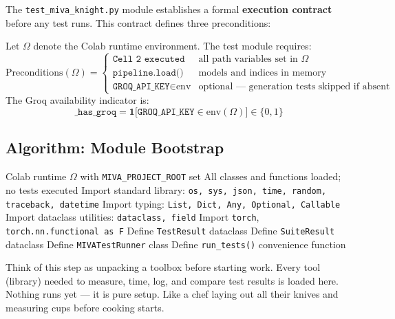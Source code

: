 \documentclass[12pt,a4paper]{article}
\newenvironment{plainbox}[1][Plain Language]{%
  \begin{tcolorbox}[
    enhanced, breakable,
    colback=lightpurplebox!40, colframe=purple!50,
    fonttitle=\bfseries\color{purple!70!black},
    title={#1},
    attach boxed title to top left={yshift=-2mm,xshift=5mm},
    boxed title style={colback=purple!40,colframe=purple!50}
  ]%
}{\end{tcolorbox}}
\newcounter{mdef}[section]
\newenvironment{mdef}[1][]{%
  \refstepcounter{mdef}%
  \begin{tcolorbox}[mydef, title={Definition~\thesection.\themdef%
    \ifx\relax#1\relax\else\ (#1)\fi}]%
}{\end{tcolorbox}}
\begin{document}
The \texttt{test\_miva\_knight.py} module establishes a formal \textbf{execution contract}
before any test runs. This contract defines three preconditions:

\begin{mdef}[Execution Preconditions]
Let $\Omega$ denote the Colab runtime environment. The test module requires:
\[
  \text{Preconditions}(\Omega) = \begin{cases}
    \texttt{Cell~2 executed}     & \text{all path variables set in } \Omega \\
    \texttt{pipeline.load()}     & \text{models and indices in memory} \\
    \texttt{GROQ\_API\_KEY} \in \text{env} & \text{optional — generation tests skipped if absent}
  \end{cases}
\]
The Groq availability indicator is:
\[
  \texttt{\_has\_groq} = \mathbf{1}\bigl[\texttt{GROQ\_API\_KEY} \in \text{env}(\Omega)\bigr] \in \{0, 1\}
\]
\end{mdef}

\subsection{Algorithm: Module Bootstrap}

\begin{algorithm}[H]
\caption{Module Bootstrap --- \texttt{test\_miva\_knight.py} initialisation}
\label{alg:bootstrap}
\begin{algorithmic}[1]
\Require Colab runtime $\Omega$ with \texttt{MIVA\_PROJECT\_ROOT} set
\Ensure All classes and functions loaded; no tests executed
\State Import standard library: \texttt{os, sys, json, time, random, traceback, datetime}
\State Import typing: \texttt{List, Dict, Any, Optional, Callable}
\State Import dataclass utilities: \texttt{dataclass, field}
\State Import \texttt{torch}, \texttt{torch.nn.functional as F}
\State Define \texttt{TestResult} dataclass 
\State Define \texttt{SuiteResult} dataclass 
\State Define \texttt{MIVATestRunner} class 
\State Define \texttt{run\_tests()} convenience function
\end{algorithmic}
\end{algorithm}

\begin{plainbox}
Think of this step as unpacking a toolbox before starting work. Every tool
(library) needed to measure, time, log, and compare test results is loaded here.
Nothing runs yet --- it is pure setup. Like a chef laying out all their knives
and measuring cups before cooking starts.
\end{plainbox}
\end{document}
